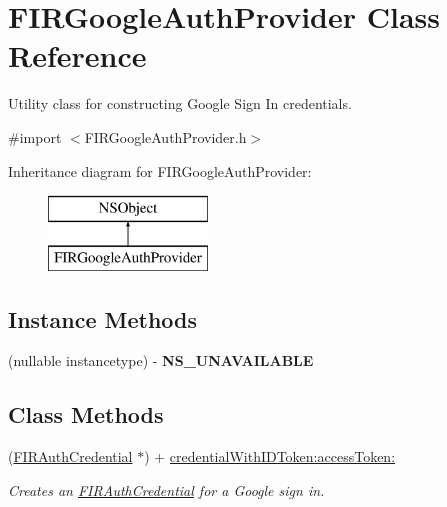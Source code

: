 \hypertarget{interface_f_i_r_google_auth_provider}{}\section{F\+I\+R\+Google\+Auth\+Provider Class Reference}
\label{interface_f_i_r_google_auth_provider}


Utility class for constructing Google Sign In credentials.  




{\ttfamily \#import $<$F\+I\+R\+Google\+Auth\+Provider.\+h$>$}

Inheritance diagram for F\+I\+R\+Google\+Auth\+Provider\+:\begin{figure}[H]
\begin{center}
\leavevmode
\includegraphics[height=2.000000cm]{interface_f_i_r_google_auth_provider}
\end{center}
\end{figure}
\subsection*{Instance Methods}
\begin{DoxyCompactItemize}
\item 
\hypertarget{interface_f_i_r_google_auth_provider_a9f6364e69893bd89fd6477483f8b9e86}{}(nullable instancetype) -\/ {\bfseries N\+S\+\_\+\+U\+N\+A\+V\+A\+I\+L\+A\+B\+L\+E}\label{interface_f_i_r_google_auth_provider_a9f6364e69893bd89fd6477483f8b9e86}

\end{DoxyCompactItemize}
\subsection*{Class Methods}
\begin{DoxyCompactItemize}
\item 
(\hyperlink{interface_f_i_r_auth_credential}{F\+I\+R\+Auth\+Credential} $\ast$) + \hyperlink{interface_f_i_r_google_auth_provider_ab02597c578709236041ef4263214e27f}{credential\+With\+I\+D\+Token\+:access\+Token\+:}
\begin{DoxyCompactList}\small\item\em Creates an {\ttfamily \hyperlink{interface_f_i_r_auth_credential}{F\+I\+R\+Auth\+Credential}} for a Google sign in. \end{DoxyCompactList}\end{DoxyCompactItemize}


